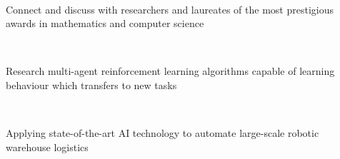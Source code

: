 \documentclass[]{lukas-cv-openfont}
\begin{document}

\noindent
{}
\\
\begin{tightitemize}{1.7em}
    \item Connect and discuss with researchers and laureates of the most prestigious awards in mathematics and computer science
\end{tightitemize}
\largesectionsep

\noindent
{}
\\
\begin{tightitemize}{1.7em}
    \item Research multi-agent reinforcement learning algorithms capable of learning behaviour which transfers to new tasks
\end{tightitemize}
\largesectionsep

\noindent
{}
\\
\begin{tightitemize}{1.7em}
    \item Applying state-of-the-art AI technology to automate large-scale robotic warehouse logistics
\end{tightitemize}
\largesectionsep



\end{document}
